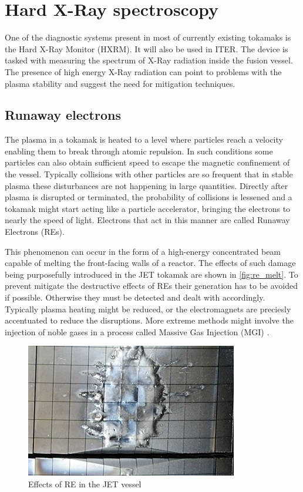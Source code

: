 \section{Hard X-Ray spectroscopy}

One of the diagnostic systems present in most of currently existing tokamaks
is the Hard X-Ray Monitor (HXRM). It will also be used in ITER.
The device is tasked with measuring the spectrum of X-Ray radiation
inside the fusion vessel. The presence of high energy X-Ray
radiation can point to problems with the plasma stability and suggest the 
need for mitigation techniques.
\cite{low_noise_amplifier_for_pmt}

\subsection{Runaway electrons}

The plasma in a tokamak is heated to a level where particles reach a velocity
enabling them to break through atomic repulsion. In such conditions some 
particles can also obtain sufficient speed to escape the magnetic confinement
of the vessel. Typically collisions with other particles are so frequent
that in stable plasma these disturbances are not happening in large quantities.
Directly after plasma is disrupted or terminated, 
the probability of collisions is lessened 
and a tokamak might start acting like a particle accelerator,
bringing the electrons to nearly the speed of light.
Electrons that act in this manner are called Runaway Electrons (REs).
\cite{iter_re_melt}


This phenomenon can occur in the form of a high-energy 
concentrated beam capable of melting the front-facing walls of a reactor.
The effects of such damage being purposefully introduced in the JET tokamak
are shown in \autoref{fig:re_melt}. To prevent mitigate the destructive
effects of REs their generation has to be avoided if possible. Otherwise
they must be detected and dealt with accordingly. Typically plasma heating
might be reduced, or the electromagnets are preciesly accentuated
to reduce the disruptions. More extreme methods might 
involve the injection of noble gases in a process called 
Massive Gas Injection (MGI) \cite{massive_gas_injection}.
\begin{figure}[H]
  \centering
  \includegraphics[width=.7\linewidth]{media/re_melt.jpeg}
  \caption{Effects of RE in the JET vessel\cite{iter_re_melt}}
  \label{fig:re_melt}
\end{figure}


